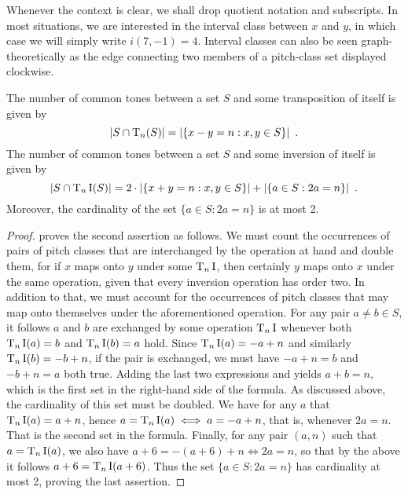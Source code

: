 Whenever the context is clear, we shall drop quotient notation and subscripts. In most
situations, we are interested in the interval class between $x$ and $y$, in which case we
will simply write $i(7, -1) = 4$. Interval classes can also be seen graph-theoretically as
the edge connecting two members of a pitch-class set displayed clockwise.

\begin{theorem}
	The number of common tones between a set $S$ and some transposition of itself is given by
	\begin{equation}
		|S \cap \operatorname{T}_n(S)| = |\{x - y = n : x, y \in S\}| \enspace.
	\end{equation}
	The number of common tones between a set $S$ and some inversion of itself is given by
	\begin{equation}
		|S \cap \operatorname{T}_n\operatorname{I}(S)| = 2 \cdot |\{x + y = n : x, y \in S\}| +
		|\{a \in S : 2a = n\}| \enspace.
	\end{equation}
	Moreover, the cardinality of the set $\{a \in S : 2a = n\}$ is at most 2.
	\begin{proof}
		\cite[10]{Rahn1975} proves the second assertion as follows. We must count the
		occurrences of pairs of pitch classes that are interchanged by the operation at
		hand and double them, for if $x$ maps onto $y$ under some $\operatorname{T}_n\operatorname{I}$, then certainly
		$y$ maps onto $x$ under the same operation, given that every inversion operation
		has order two. In addition to that, we must account for the occurrences of pitch
		classes that may map onto themselves under the aforementioned operation. For any
		pair $a \ne b \in S$, it follows $a$ and $b$ are exchanged by some operation
		$\operatorname{T}_n\operatorname{I}$ whenever both $\operatorname{T}_n\operatorname{I}(a) = b$ and $\operatorname{T}_n\operatorname{I}(b) = a$ hold. Since
		$\operatorname{T}_n\operatorname{I}(a) = -a + n$ and similarly $\operatorname{T}_n\operatorname{I}(b) = -b + n$, if the pair is exchanged,
		we must have $-a + n = b$ and $-b + n = a$ both true. Adding the last two
		expressions and yields $a + b = n$, which is the first set in the right-hand side
		of the formula. As discussed above, the cardinality of this set must be doubled.
		We have for any $a$ that $\operatorname{T}_n\operatorname{I}(a) = a + n$, hence $a = \operatorname{T}_n\operatorname{I}(a) \iff a = -a + n$,
		that is, whenever $2a = n$. That is the second set in the formula. Finally,
		for any pair $(a, n)$ such that $a = \operatorname{T}_n\operatorname{I}(a)$, we also have
		$a + 6 = -(a + 6) + n \iff 2a = n$, so that by the above it follows
		$a + 6 = \operatorname{T}_n\operatorname{I}(a + 6)$. Thus the set $\{a \in S : 2a = n\}$ has cardinality
		at most 2, proving the last assertion.
	\end{proof}
\end{theorem}

